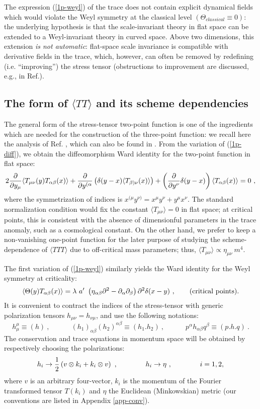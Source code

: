 \documentclass[11pt]{article}
\newcommand{\beq}{\begin{equation}}
\newcommand{\eeq}{\end{equation}}
\def\de{\partial}
\def\a{\alpha}
\def\b{\beta}
\def\d{\delta}
\def\l{\lambda}
\def\T{\Theta}
\def\half{{1 \over 2}}
\def\bra{\langle}
\def\ket{\rangle}
\begin{document}
The expression (\ref{1p-weyl}) of the trace does not
contain explicit dynamical fields which would violate
the Weyl symmetry at the classical level
$\left( \Theta_{classical}\equiv 0 \right)$:
the underlying hypothesis is that the scale-invariant theory 
in flat space can be extended to a Weyl-invariant theory in curved space.
Above two dimensions, this extension {\it is not automatic}:
flat-space scale invariance is compatible with
derivative fields in the trace, which, however, can often be removed by 
redefining (i.e. ``improving'') the stress tensor \cite{polch}
(obstructions to improvement are discussed, e.g., in Ref.\cite{cfl}).
 

\subsection{The form of $\bra TT\ket$ and its scheme dependencies}

The general form of the stress-tensor two-point function is 
one of the ingredients which are needed for the construction of the 
three-point function: we recall here the analysis of Ref. \cite{cfl}, which 
can also be found in \cite{duff}\cite{hore}. 
From the variation of (\ref{1p-diff}), we obtain the diffeomorphism Ward
identity for the two-point function in flat space:  
\beq\label{2p-difx} 
2 {\de\over\de y_\mu} \bra T_{\mu\nu}(y)T_{\a\b}(x)\ket + 
{\de\over\de y^{(\a} } \left( \d (y-x) \bra T_{\b)\nu}(x)\ket \right) +
\left( {\de\over\de y^\nu}\d(y-x) \right) \bra T_{\a\b}(x) \ket =0 \ , 
\eeq 
where the symmetrization of indices is 
$x^{(\mu} y^{\nu)}= x^\mu y^\nu + y^\mu x^\nu $.
The standard normalization condition would fix the constant
$\bra T_{\mu\nu}\ket = 0$ in flat space; at critical points, 
this is consistent with the absence of dimensionful parameters in the 
trace anomaly, such as a cosmological constant.
On the other hand, we prefer to keep a non-vanishing one-point
function for the later purpose of studying the scheme-dependence of 
$\bra TTT\ket$ due to off-critical mass parameters;
thus, $\bra T_{\mu\nu}\ket \propto \eta_{\mu\nu}\ m^4$.

The first variation of (\ref{1p-weyl}) similarly yields the
Ward identity for the Weyl symmetry at criticality: 
\beq
\label{2p-weyx} 
\bra \T (y) T_{\a\b}(x) \ket = \l\  
a'\ \left(\eta_{\a\b} \de^2  - \de_\a \de_\b \right) 
\de^2 \d (x-y) \ , \qquad ({\rm critical}\ {\rm points}). 
\eeq 
It is convenient to contract the indices of  
the stress-tensor with generic polarization tensors $h_{\mu\nu}=h_{\nu\mu}$, 
and use the following notations: 
\beq\label{h-def} 
h_\mu^\mu \equiv (h)\ , 
\qquad\quad (h_1)_{\a\b} (h_2)^{\a\b} \equiv (h_1 . h_2)\ ,
\qquad\quad p^\a h_{\a\b} q^\b \equiv (p.h.q)\ .
\eeq 
The conservation and trace equations in momentum space 
will be obtained by respectively choosing the polarizations:
\beq\label{c-t-tens} 
h_i \to \half \left(v \otimes k_i +k_i \otimes v \right)\ , 
\qquad\qquad h_i \to \eta \ ,\qquad\qquad i=1,2, 
\eeq 
where $v$ is an arbitrary four-vector, $k_i$ is the momentum 
of the Fourier transformed tensor $T(k_i)$  
and $\eta$ the Euclidean (Minkowskian) metric
(our conventions are listed in Appendix \ref{app-conv}).
 
\end{document}
